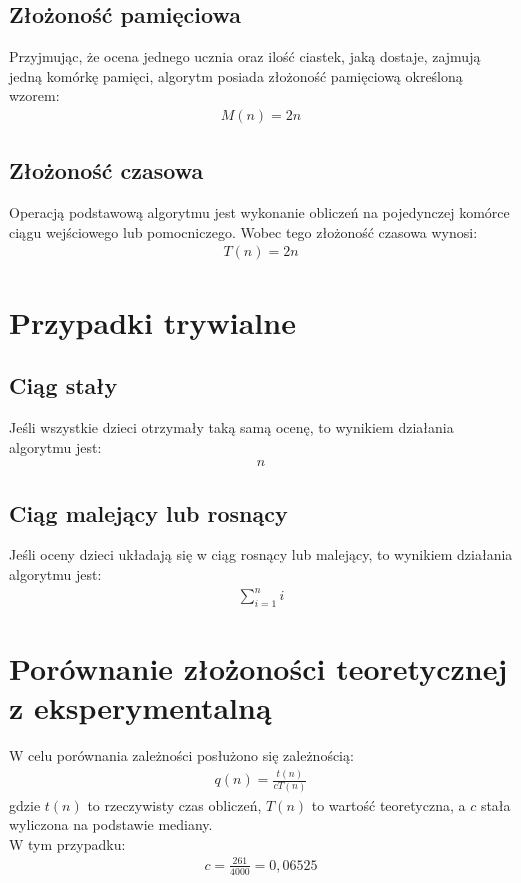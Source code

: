 \documentclass{article}
\begin{document}
	\subsection{Złożoność pamięciowa}
	Przyjmując, że ocena jednego ucznia oraz ilość ciastek, jaką dostaje, zajmują jedną komórkę pamięci, algorytm posiada złożoność pamięciową określoną wzorem:
	\begin{align*}
		M(n) = 2n
	\end{align*}

	\subsection{Złożoność czasowa}
	Operacją podstawową algorytmu jest wykonanie obliczeń na pojedynczej komórce ciągu wejściowego lub pomocniczego. Wobec tego złożoność czasowa wynosi:
	\begin{align*}
		T(n) = 2n
	\end{align*}

	\newpage
	\section{Przypadki trywialne}

	\subsection{Ciąg stały}

	Jeśli wszystkie dzieci otrzymały taką samą ocenę, to wynikiem działania algorytmu jest:
	\begin{align*}
		n
	\end{align*}

	\subsection{Ciąg malejący lub rosnący}

	Jeśli oceny dzieci układają się w ciąg rosnący lub malejący, to wynikiem działania algorytmu jest:
	\begin{align*}
		\displaystyle\sum_{i=1}^{n} i
	\end{align*}

	\section{Porównanie złożoności teoretycznej z eksperymentalną}
	W celu porównania zależności posłużono się zależnością:
	\begin{align*}
		q(n) = \frac{t(n)}{cT(n)}
	\end{align*}
	gdzie $t(n)$ to rzeczywisty czas obliczeń, $T(n)$ to wartość teoretyczna, a $c$ stała wyliczona na podstawie mediany. \\
	W tym przypadku:
	\begin{align*}
		c = \frac{261}{4000} = 0,06525
	\end{align*}
\end{document}
